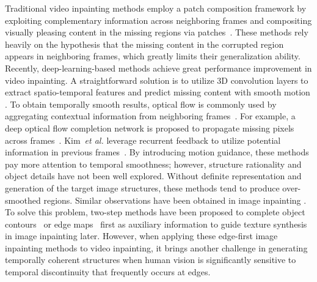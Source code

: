 Traditional video inpainting methods employ a patch composition framework by exploiting complementary information across neighboring frames and compositing visually pleasing content in the missing regions via patches~\cite{patwardhan2007video,wexler2004space,newson2014video}.
% 
These methods rely heavily on the hypothesis that the missing content in the corrupted region appears in neighboring frames, which greatly limits their generalization ability.
%
Recently, deep-learning-based methods achieve great performance improvement in video inpainting.
A straightforward solution is to utilize 3D convolution layers to extract spatio-temporal features and predict missing content with smooth motion \cite{wang2019video}.
To obtain temporally smooth results, optical flow is commonly used by aggregating contextual information from neighboring frames~\cite{Kim_2019_CVPR1,Xu_2019_CVPR,Kim_2019_CVPR}.
For example, a deep optical flow completion network is proposed to propagate missing pixels across frames~\cite{Xu_2019_CVPR}. 
Kim~\emph{et al.} leverage recurrent feedback to utilize potential information in previous frames~\cite{Kim_2019_CVPR,Kim_2019_CVPR1}.
By introducing motion guidance, these methods pay more attention to temporal smoothness; however, structure rationality and object details have not been well explored. 
%
Without definite representation and generation of the target image structures, these methods tend to produce over-smoothed regions. 
Similar observations have been obtained in image inpainting \cite{Xiong_2019_CVPR,nazeri2019edgeconnect}.
To solve this problem, two-step methods have been proposed to complete object contours~\cite{Xiong_2019_CVPR} or edge maps~\cite{nazeri2019edgeconnect} first as auxiliary information to guide texture synthesis in image inpainting later.
%
However, when applying these edge-first image inpainting methods to video inpainting, it brings another challenge in generating temporally coherent structures when human vision is significantly sensitive to temporal discontinuity that frequently occurs at edges. 


